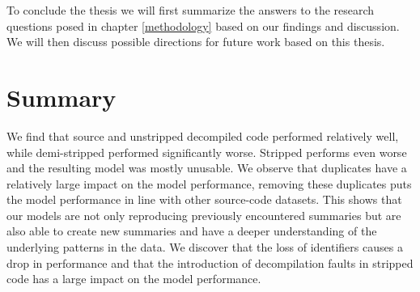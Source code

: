 To conclude the thesis we will first summarize the answers to the research questions posed in chapter \ref{methodology} based on our findings and discussion. We will then discuss possible directions for future work based on this thesis. 
\section{Summary}
We find that source and unstripped decompiled code performed relatively well, while demi-stripped performed significantly worse. Stripped performs even worse and the resulting model was mostly unusable. We observe that duplicates have a relatively large impact on the model performance, removing these duplicates puts the model performance in line with other source-code datasets. This shows that our models are not only reproducing previously encountered summaries but are also able to create new summaries and have a deeper understanding of the underlying patterns in the data. We discover that the loss of identifiers causes a drop in performance and that the introduction of decompilation faults in stripped code has a large impact on the model performance.

